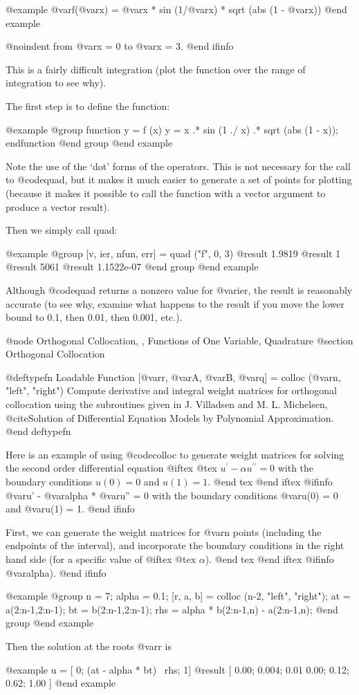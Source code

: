@example
  @var{f}(@var{x}) = @var{x} * sin (1/@var{x}) * sqrt (abs (1 - @var{x}))
@end example

@noindent
from @var{x} = 0 to @var{x} = 3.
@end ifinfo

This is a fairly difficult integration (plot the function over the range
of integration to see why).

The first step is to define the function:

@example
@group
function y = f (x)
  y = x .* sin (1 ./ x) .* sqrt (abs (1 - x));
endfunction
@end group
@end example

Note the use of the `dot' forms of the operators.  This is not necessary
for the call to @code{quad}, but it makes it much easier to generate a
set of points for plotting (because it makes it possible to call the
function with a vector argument to produce a vector result).

Then we simply call quad:

@example
@group
[v, ier, nfun, err] = quad ("f", 0, 3)
     @result{} 1.9819
     @result{} 1
     @result{} 5061
     @result{} 1.1522e-07
@end group
@end example

Although @code{quad} returns a nonzero value for @var{ier}, the result
is reasonably accurate (to see why, examine what happens to the result
if you move the lower bound to 0.1, then 0.01, then 0.001, etc.).

@node Orthogonal Collocation,  , Functions of One Variable, Quadrature
@section Orthogonal Collocation

@deftypefn {Loadable Function} {[@var{r}, @var{A}, @var{B}, @var{q}] =} colloc (@var{n}, "left", "right")
Compute derivative and integral weight matrices for orthogonal
collocation using the subroutines given in J. Villadsen and
M. L. Michelsen, @cite{Solution of Differential Equation Models by
Polynomial Approximation}.
@end deftypefn

Here is an example of using @code{colloc} to generate weight matrices
for solving the second order differential equation
@iftex
@tex
$u^\prime - \alpha u^{\prime\prime} = 0$ with the boundary conditions
$u(0) = 0$ and $u(1) = 1$.
@end tex
@end iftex
@ifinfo
@var{u}' - @var{alpha} * @var{u}'' = 0 with the boundary conditions
@var{u}(0) = 0 and @var{u}(1) = 1.
@end ifinfo

First, we can generate the weight matrices for @var{n} points (including
the endpoints of the interval), and incorporate the boundary conditions
in the right hand side (for a specific value of
@iftex
@tex
$\alpha$).
@end tex
@end iftex
@ifinfo
@var{alpha}).
@end ifinfo

@example
@group
n = 7;
alpha = 0.1;
[r, a, b] = colloc (n-2, "left", "right");
at = a(2:n-1,2:n-1);
bt = b(2:n-1,2:n-1);
rhs = alpha * b(2:n-1,n) - a(2:n-1,n);
@end group
@end example

Then the solution at the roots @var{r} is

@example
u = [ 0; (at - alpha * bt) \ rhs; 1]
     @result{} [ 0.00; 0.004; 0.01 0.00; 0.12; 0.62; 1.00 ]
@end example
